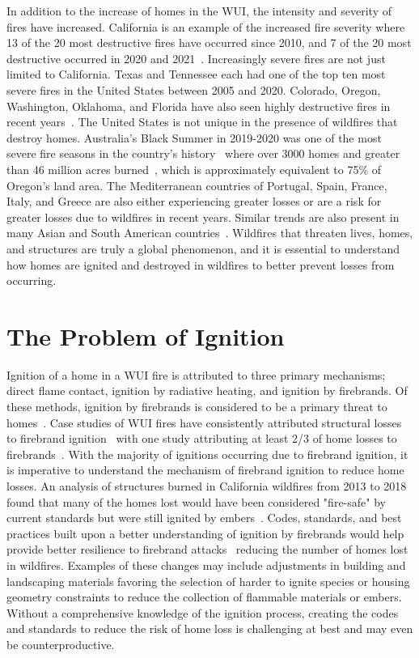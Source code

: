     In addition to the increase of homes in the WUI, the intensity and severity of fires have increased. California is an example of the increased fire severity where 13 of the 20 most destructive fires have occurred since 2010, and 7 of the 20 most destructive occurred in 2020 and 2021~\cite{CALFIRE2018}. Increasingly severe fires are not just limited to California. Texas and Tennessee each had one of the top ten most severe fires in the United States between 2005 and 2020. Colorado, Oregon, Washington, Oklahoma, and Florida have also seen highly destructive fires in recent years~\cite{Barrett2020}. The United States is not unique in the presence of wildfires that destroy homes. Australia's Black Summer in 2019-2020 was one of the most severe fire seasons in the country's history~\cite{Levin2021Unveiling2019/2020} where over 3000 homes and greater than 46 million acres burned~\cite{Filkov2020ImpactTrends}, which is approximately equivalent to 75\% of Oregon's land area. The Mediterranean countries of Portugal, Spain, France, Italy, and Greece are also either experiencing greater losses or are a risk for greater losses due to wildfires in recent years. Similar trends are also present in many Asian and South American countries~\cite{Manzello2018}. Wildfires that threaten lives, homes, and structures are truly a global phenomenon, and it is essential to understand how homes are ignited and destroyed in wildfires to better prevent losses from occurring.

\section{The Problem of Ignition}
    Ignition of a home in a WUI fire is attributed to three primary mechanisms; direct flame contact, ignition by radiative heating, and ignition by firebrands. Of these methods, ignition by firebrands is considered to be a primary threat to homes~\cite{Suzuki2021, Mell2010, Manzello2018FORUMResearch}. Case studies of WUI fires have consistently attributed structural losses to firebrand ignition~\cite{Westhaver2017WhyDisaster, Roberts2021} with one study attributing at least 2/3 of home losses to firebrands~\cite{Mell2011}. With the majority of ignitions occurring due to firebrand ignition, it is imperative to understand the mechanism of firebrand ignition to reduce home losses. An analysis of structures burned in California wildfires from 2013 to 2018 found that many of the homes lost would have been considered "fire-safe" by current standards but were still ignited by embers~\cite{Syphard2019}. Codes, standards, and best practices built upon a better understanding of ignition by firebrands would help provide better resilience to firebrand attacks~\cite{Manzello2020} reducing the number of homes lost in wildfires. Examples of these changes may include adjustments in building and landscaping materials favoring the selection of harder to ignite species or housing geometry constraints to reduce the collection of flammable materials or embers. Without a comprehensive knowledge of the ignition process, creating the codes and standards to reduce the risk of home loss is challenging at best and may even be counterproductive.  
    
